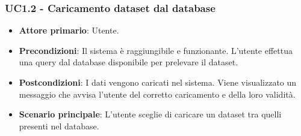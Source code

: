 \subsubsection{UC1.2 - Caricamento dataset dal database}

\begin{itemize}
	\item \textbf{Attore primario}: Utente.
	\item \textbf{Precondizioni}: Il sistema è raggiungibile e funzionante. L'utente effettua una query dal database disponibile per prelevare il dataset.
	\item \textbf{Postcondizioni}: I dati vengono caricati nel sistema. Viene visualizzato un messaggio che avvisa l'utente del corretto caricamento e della loro validità.
	\item \textbf{Scenario principale}: L'utente sceglie di caricare un dataset tra quelli presenti nel database.
	
\end{itemize}


  